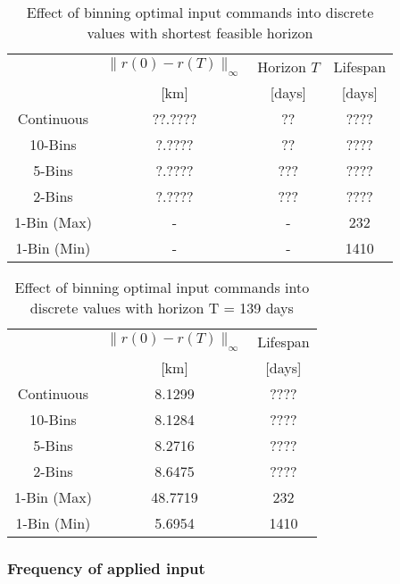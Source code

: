\documentclass[letterpaper, 10 pt, conference]{ieeeconf}  %
\begin{document}
\begin{table}[h]%
 \begin{center}
  \caption{Effect of binning optimal input commands into discrete values with shortest feasible horizon}
  \label{tab:shortesthorizon}
  \begin{tabular}{c|ccc}
        & $\lVert r(0)-r(T) \rVert_{\infty}$ & Horizon $T$ & Lifespan \\
        & [km]                                         & [days]            & [days] \\ \hline
        Continuous & ??.???? & ?? & ???? \\
        10-Bins & ?.???? & ?? & ???? \\
        5-Bins & ?.???? & ??? & ???? \\
        2-Bins & ?.???? & ??? & ???? \\ \hline
        1-Bin (Max) & - & - & 232 \\
        1-Bin (Min) & - & - & 1410 \\
  \end{tabular}
 \end{center}
\end{table}

\begin{table}[b]%
 \begin{center}
  \caption{Effect of binning optimal input commands into discrete values with horizon T = 139 days}
  \label{tab:fixedhorizon}
  \begin{tabular}{c|cc}
        & $\lVert r(0)-r(T) \rVert_{\infty}$ & Lifespan \\
        & [km]                                          & [days] \\ \hline
        Continuous & 8.1299 & ???? \\
        10-Bins & 8.1284 & ???? \\
        5-Bins & 8.2716 & ???? \\
        2-Bins & 8.6475 & ???? \\ \hline
        1-Bin (Max) & 48.7719 & 232 \\
        1-Bin (Min) & 5.6954 & 1410 \\
  \end{tabular}
 \end{center}
\end{table}


\subsubsection{Frequency of applied input}
\end{document}
